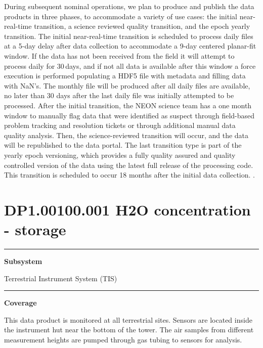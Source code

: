\documentclass[]{article}
\begin{document}
During subsequent nominal operations, we plan to produce and publish the
data products in three phases, to accommodate a variety of use cases:
the initial near-real-time transition, a science reviewed quality
transition, and the epoch yearly transition. The initial near-real-time
transition is scheduled to process daily files at a 5-day delay after
data collection to accommodate a 9-day centered planar-fit window. If
the data has not been received from the field it will attempt to process
daily for 30\,days, and if not all data is available after this window a
force execution is performed populating a HDF5 file with metadata and
filling data with NaN's. The monthly file will be produced after all
daily files are available, no later than 30 days after the last daily
file was initially attempted to be processed. After the initial
transition, the NEON science team has a one month window to manually
flag data that were identified as suspect through field-based problem
tracking and resolution tickets or through additional manual data
quality analysis. Then, the science-reviewed transition will occur, and
the data will be republished to the data portal. The last transition
type is part of the yearly epoch versioning, which provides a fully
quality assured and quality controlled version of the data using the
latest full release of the processing code. This transition is scheduled
to occur 18 months after the initial data collection. \newpage
.

\section{DP1.00100.001 H2O concentration -
storage}\label{dp1.00100.001-h2o-concentration---storage}

\begin{center}\rule{0.5\linewidth}{\linethickness}\end{center}

\textbf{Subsystem}

Terrestrial Instrument System (TIS)

\begin{center}\rule{0.5\linewidth}{\linethickness}\end{center}

\textbf{Coverage}

This data product is monitored at all terrestrial sites. Sensors are
located inside the instrument hut near the bottom of the tower. The air
samples from different measurement heights are pumped through gas tubing
to sensors for analysis.
\end{document}
